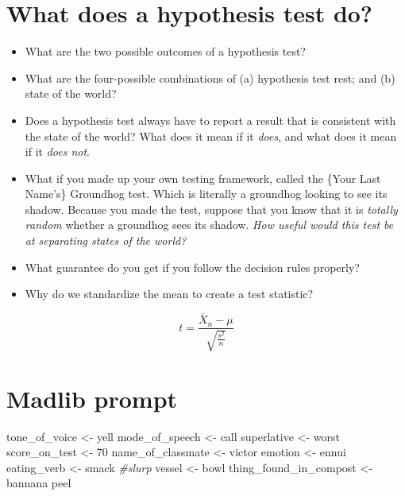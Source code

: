\documentclass[
]{book}
\newenvironment{Shaded}{\begin{snugshade}}{\end{snugshade}}
\newcommand{\CommentTok}[1]{\textcolor[rgb]{0.56,0.35,0.01}{\textit{#1}}}
\newcommand{\NormalTok}[1]{#1}
\newcommand{\OtherTok}[1]{\textcolor[rgb]{0.56,0.35,0.01}{#1}}
\newcommand{\StringTok}[1]{\textcolor[rgb]{0.31,0.60,0.02}{#1}}
\providecommand{\tightlist}{%
  \setlength{\itemsep}{0pt}\setlength{\parskip}{0pt}}
\theoremstyle{definition}
\theoremstyle{definition}
\theoremstyle{definition}
\theoremstyle{definition}
\theoremstyle{remark}
\begin{document}
\hypertarget{what-does-a-hypothesis-test-do}{%
\section{What does a hypothesis test do?}\label{what-does-a-hypothesis-test-do}}

\begin{itemize}
\tightlist
\item
  What are the two possible outcomes of a hypothesis test?
\item
  What are the four-possible combinations of (a) hypothesis test rest; and (b) state of the world?
\item
  Does a hypothesis test always have to report a result that is consistent with the state of the world? What does it mean if it \emph{does}, and what does it mean if it \emph{does not}.
\item
  What if you made up your own testing framework, called the \{Your Last Name's\} Groundhog test. Which is literally a groundhog looking to see its shadow. Because you made the test, suppose that you know that it is \emph{totally random} whether a groundhog sees its shadow. \emph{How useful would this test be at separating states of the world?}\\
\item
  What guarantee do you get if you follow the decision rules properly?
\item
  Why do we standardize the mean to create a test statistic?
\end{itemize}

\[ 
  t = \frac{ \overline{X}_n - \mu}{\sqrt{\frac{s^2}{n}}}
\]

\hypertarget{madlib-prompt}{%
\section{Madlib prompt}\label{madlib-prompt}}

\begin{Shaded}
\begin{Highlighting}[]
\NormalTok{tone\_of\_voice     }\OtherTok{\textless{}{-}} \StringTok{\textquotesingle{}yell\textquotesingle{}}
\NormalTok{mode\_of\_speech    }\OtherTok{\textless{}{-}} \StringTok{\textquotesingle{}call\textquotesingle{}}
\NormalTok{superlative       }\OtherTok{\textless{}{-}} \StringTok{\textquotesingle{}worst\textquotesingle{}}
\NormalTok{score\_on\_test     }\OtherTok{\textless{}{-}} \StringTok{\textquotesingle{}70\textquotesingle{}}
\NormalTok{name\_of\_classmate }\OtherTok{\textless{}{-}} \StringTok{\textquotesingle{}victor\textquotesingle{}}
\NormalTok{emotion           }\OtherTok{\textless{}{-}} \StringTok{\textquotesingle{}ennui\textquotesingle{}}
\NormalTok{eating\_verb       }\OtherTok{\textless{}{-}} \StringTok{\textquotesingle{}smack\textquotesingle{}} \CommentTok{\#slurp}
\NormalTok{vessel            }\OtherTok{\textless{}{-}} \StringTok{\textquotesingle{}bowl\textquotesingle{}}
\NormalTok{thing\_found\_in\_compost }\OtherTok{\textless{}{-}} \StringTok{\textquotesingle{}bannana peel\textquotesingle{}}
\end{Highlighting}
\end{Shaded}
\end{document}
